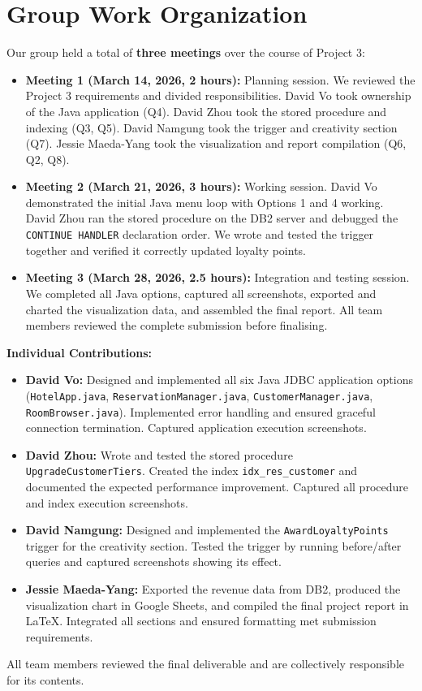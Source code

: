 \documentclass[12pt,letterpaper]{article}
\begin{document}
\section{Group Work Organization}

Our group held a total of \textbf{three meetings} over the course of Project 3:

\begin{itemize}
    \item \textbf{Meeting 1 (March 14, 2026, 2 hours):} Planning session. We reviewed the Project 3 requirements and divided responsibilities. David Vo took ownership of the Java application (Q4). David Zhou took the stored procedure and indexing (Q3, Q5). David Namgung took the trigger and creativity section (Q7). Jessie Maeda-Yang took the visualization and report compilation (Q6, Q2, Q8).

    \item \textbf{Meeting 2 (March 21, 2026, 3 hours):} Working session. David Vo demonstrated the initial Java menu loop with Options 1 and 4 working. David Zhou ran the stored procedure on the DB2 server and debugged the \texttt{CONTINUE HANDLER} declaration order. We wrote and tested the trigger together and verified it correctly updated loyalty points.

    \item \textbf{Meeting 3 (March 28, 2026, 2.5 hours):} Integration and testing session. We completed all Java options, captured all screenshots, exported and charted the visualization data, and assembled the final report. All team members reviewed the complete submission before finalising.
\end{itemize}

\textbf{Individual Contributions:}
\begin{itemize}
    \item \textbf{David Vo:} Designed and implemented all six Java JDBC application options (\texttt{HotelApp.java}, \texttt{ReservationManager.java}, \texttt{CustomerManager.java}, \texttt{RoomBrowser.java}). Implemented error handling and ensured graceful connection termination. Captured application execution screenshots.

    \item \textbf{David Zhou:} Wrote and tested the stored procedure \texttt{UpgradeCustomerTiers}. Created the index \texttt{idx\_res\_customer} and documented the expected performance improvement. Captured all procedure and index execution screenshots.

    \item \textbf{David Namgung:} Designed and implemented the \texttt{AwardLoyaltyPoints} trigger for the creativity section. Tested the trigger by running before/after queries and captured screenshots showing its effect.

    \item \textbf{Jessie Maeda-Yang:} Exported the revenue data from DB2, produced the visualization chart in Google Sheets, and compiled the final project report in \LaTeX. Integrated all sections and ensured formatting met submission requirements.
\end{itemize}

All team members reviewed the final deliverable and are collectively responsible for its contents.
\end{document}
